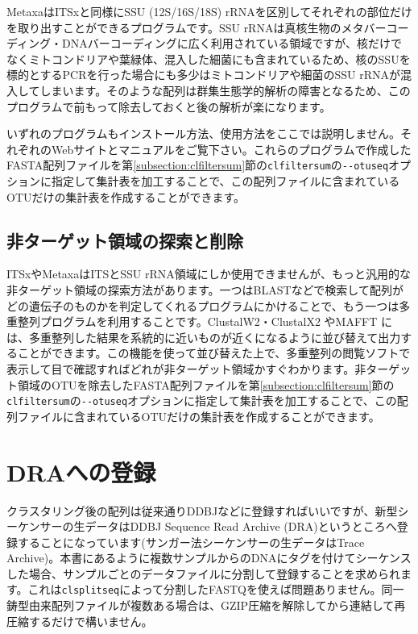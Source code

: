 \documentclass[titlepage,10pt,a4paper]{jsbook}
\begin{document}
MetaxaはITSxと同様にSSU (12S/16S/18S) rRNAを区別してそれぞれの部位だけを取り出すことができるプログラムです\citep{Bengtsson2011}。SSU rRNAは真核生物のメタバーコーディング・DNAバーコーディングに広く利用されている領域ですが、核だけでなくミトコンドリアや葉緑体、混入した細菌にも含まれているため、核のSSUを標的とするPCRを行った場合にも多少はミトコンドリアや細菌のSSU rRNAが混入してしまいます。そのような配列は群集生態学的解析の障害となるため、このプログラムで前もって除去しておくと後の解析が楽になります。

いずれのプログラムもインストール方法、使用方法をここでは説明しません。それぞれのWebサイトとマニュアルをご覧下さい。これらのプログラムで作成したFASTA配列ファイルを第\ref{subsection:clfiltersum}節の\texttt{clfiltersum}の\texttt{{-}{-}otuseq}オプションに指定して集計表を加工することで、この配列ファイルに含まれているOTUだけの集計表を作成することができます。

\subsection{非ターゲット領域の探索と削除}

ITSxやMetaxaはITSとSSU rRNA領域にしか使用できませんが、もっと汎用的な非ターゲット領域の探索方法があります。一つはBLASTなどで検索して配列がどの遺伝子のものかを判定してくれるプログラムにかけることで、もう一つは多重整列プログラムを利用することです。ClustalW2・ClustalX2 \citep{Larkin2007}やMAFFT \citep{Katoh2013}には、多重整列した結果を系統的に近いものが近くになるように並び替えて出力することができます。この機能を使って並び替えた上で、多重整列の閲覧ソフトで表示して目で確認すればどれが非ターゲット領域かすぐわかります。非ターゲット領域のOTUを除去したFASTA配列ファイルを第\ref{subsection:clfiltersum}節の\texttt{clfiltersum}の\texttt{{-}{-}otuseq}オプションに指定して集計表を加工することで、この配列ファイルに含まれているOTUだけの集計表を作成することができます。

\section{DRAへの登録}

クラスタリング後の配列は従来通りDDBJなどに登録すればいいですが、新型シーケンサーの生データはDDBJ Sequence Read Archive (DRA)というところへ登録することになっています(サンガー法シーケンサーの生データはTrace Archive)。本書にあるように複数サンプルからのDNAにタグを付けてシーケンスした場合、サンプルごとのデータファイルに分割して登録することを求められます。これは\texttt{clsplitseq}によって分割したFASTQを使えば問題ありません。同一鋳型由来配列ファイルが複数ある場合は、GZIP圧縮を解除してから連結して再圧縮するだけで構いません。
\end{document}
